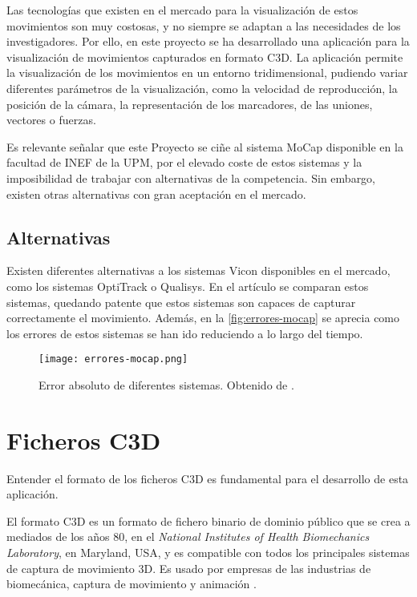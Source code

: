 Las tecnologías que existen en el mercado para la visualización de estos movimientos son muy costosas, y no siempre se adaptan a las necesidades de los investigadores. Por ello, en este proyecto se ha desarrollado una aplicación para la visualización de movimientos capturados en formato \ac{C3D}. La aplicación permite la visualización de los movimientos en un entorno tridimensional, pudiendo variar diferentes parámetros de la visualización, como la velocidad de reproducción, la posición de la cámara, la representación de los marcadores, de las uniones, vectores o fuerzas.

Es relevante señalar que este Proyecto se ciñe al sistema \ac{MoCap} disponible en la facultad de INEF de la \ac{UPM}, por el elevado coste de estos sistemas y la imposibilidad de trabajar con alternativas de la competencia. Sin embargo, existen otras alternativas con gran aceptación en el mercado.

\subsection{Alternativas}
Existen diferentes alternativas a los sistemas Vicon disponibles en el mercado, como los sistemas OptiTrack o Qualisys. En el artículo \autocite{article} se comparan estos sistemas, quedando patente que estos sistemas son capaces de capturar correctamente el movimiento. Además, en la \autoref{fig:errores-mocap} se aprecia como los errores de estos sistemas se han ido reduciendo a lo largo del tiempo.

\begin{figure}[H]
    \centering
    \texttt{[image: errores-mocap.png]}
    \caption{Error absoluto de diferentes sistemas. Obtenido de \autocite{article}.}
    \label{fig:errores-mocap}
\end{figure}

\section{Ficheros \acs{C3D}} \label{sec:ficheros-c3d}
Entender el formato de los ficheros \ac{C3D} es fundamental para el desarrollo de esta aplicación. 

El formato \ac{C3D} es un formato de fichero binario de dominio público que se crea a mediados de los años 80, en el \textit{National Institutes of Health Biomechanics Laboratory}, en Maryland, USA, y es compatible con todos los principales sistemas de captura de movimiento 3D. Es usado por empresas de las industrias de biomecánica, captura de movimiento y animación \autocite{C3DORGBiomechanicsStandard}.

